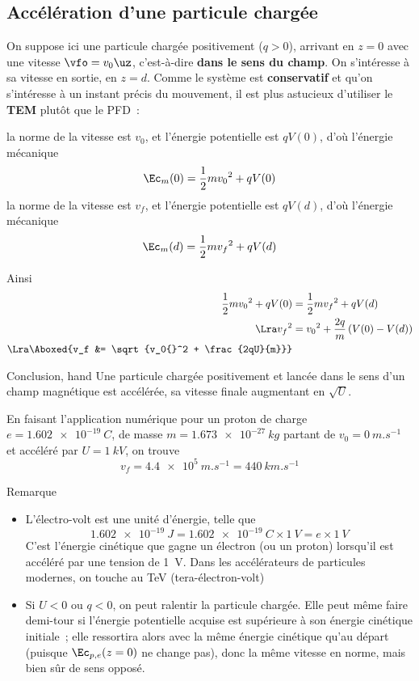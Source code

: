 \documentclass[../main/main.tex]{subfiles}
\begin{document}
\subsection{Accélération d'une particule chargée}
On suppose ici une particule chargée positivement ($q > 0$), arrivant en $z = 0$
avec une vitesse $\vfo = v_0\uz$, c'est-à-dire \textbf{dans le sens du champ}.
On s'intéresse à sa vitesse en sortie, en $z=d$. Comme le système est
\textbf{conservatif} et qu'on s'intéresse à un instant précis du mouvement, il
est plus astucieux d'utiliser le \textbf{TEM} plutôt que le PFD~: \bigbreak
\begin{itemize}[label=$\diamond$]
     la norme de la vitesse est $v_0$, et l'énergie potentielle
        est $qV(0)$, d'où l'énergie mécanique
        \[\Ec_m(0) = \frac{1}{2}mv_0{}^2 + qV(0)\]
     la norme de la vitesse est $v_f$, et l'énergie potentielle
        est $qV(d)$, d'où l'énergie mécanique
        \[\Ec_m(d) = \frac{1}{2}mv_f{}^2 + qV(d)\]
\end{itemize}
Ainsi
\begin{align*}
    \frac{1}{2}mv_0{}^2 + qV(0) &= \frac{1}{2}mv_f{}^2 + qV(d)
    \\\Lra
    v_f{}^2 &= v_0{}^2 + \frac{2q}{m}\left(V(0) - V(d)\right)
    \\\Lra
    \Aboxed{v_f &= \sqrt{v_0{}^2 + \frac{2qU}{m}}}
\end{align*}
\begin{tror}{Conclusion, hand}
    Une particule chargée positivement et lancée dans le sens d'un champ
    magnétique est accélérée, sa vitesse finale augmentant en $\sqrt{U}$.
\end{tror}

En faisant l'application numérique pour un proton de charge $e =
\SI{1.602e-19}{C}$, de masse $m = \SI{1.673e-27}{kg}$ partant de $v_0 =
\SI{0}{m.s^{-1}}$ et accéléré par $U = \SI{1}{kV}$, on trouve
\[v_f = \SI{4.4e5}{m.s^{-1}} = \SI{440}{km.s^{-1}}\]

\begin{rexem}{Remarque}
    \begin{itemize}
        \item L'électro-volt est une unité d'énergie, telle que
            \[\SI{1.602e-19}{J} = \SI{1.602e-19}{C}\times\SI{1}{V} =
            e\times\SI{1}{V}\]
            C'est l'énergie cinétique que gagne un électron (ou un proton)
            lorsqu'il est accéléré par une tension de \SI{1}{V}. Dans les
            accélérateurs de particules modernes, on touche au \si{TeV}
            (tera-électron-volt)
        \item Si $U<0$ ou $q<0$, on peut ralentir la particule chargée. Elle
            peut même faire demi-tour si l'énergie potentielle acquise est
            supérieure à son énergie cinétique initiale~; elle ressortira alors
            avec la même énergie cinétique qu'au départ (puisque
            $\Ec_{p,e}(z=0)$ ne change pas), donc la même vitesse en norme, mais
            bien sûr de sens opposé.
    \end{itemize}
\end{rexem}
\end{document}
